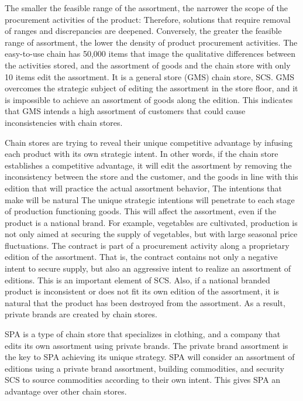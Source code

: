 \documentclass[12pt,]{article}
\begin{document}
The smaller the feasible range of the assortment, the narrower the scope
of the procurement activities of the product: Therefore, solutions that
require removal of ranges and discrepancies are deepened. Conversely,
the greater the feasible range of assortment, the lower the density of
product procurement activities. The easy-to-use chain has 50,000 items
that image the qualitative differences between the activities stored,
and the assortment of goods and the chain store with only 10 items edit
the assortment. It is a general store (GMS) chain store, SCS. GMS
overcomes the strategic subject of editing the assortment in the store
floor, and it is impossible to achieve an assortment of goods along the
edition. This indicates that GMS intends a high assortment of customers
that could cause inconsistencies with chain stores.

Chain stores are trying to reveal their unique competitive advantage by
infusing each product with its own strategic intent. In other words, if
the chain store establishes a competitive advantage, it will edit the
assortment by removing the inconsistency between the store and the
customer, and the goods in line with this edition that will practice the
actual assortment behavior, The intentions that make will be natural The
unique strategic intentions will penetrate to each stage of production
functioning goods. This will affect the assortment, even if the product
is a national brand. For example, vegetables are cultivated, production
is not only aimed at securing the supply of vegetables, but with large
seasonal price fluctuations. The contract is part of a procurement
activity along a proprietary edition of the assortment. That is, the
contract contains not only a negative intent to secure supply, but also
an aggressive intent to realize an assortment of editions. This is an
important element of SCS. Also, if a national branded product is
inconsistent or does not fit its own edition of the assortment, it is
natural that the product has been destroyed from the assortment. As a
result, private brands are created by chain stores.

SPA is a type of chain store that specializes in clothing, and a company
that edits its own assortment using private brands. The private brand
assortment is the key to SPA achieving its unique strategy. SPA will
consider an assortment of editions using a private brand assortment,
building commodities, and security SCS to source commodities according
to their own intent. This gives SPA an advantage over other chain
stores.
\end{document}
